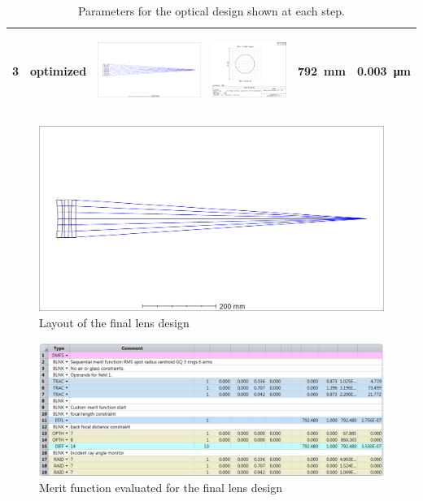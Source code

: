 \documentclass[10pt]{article}
\begin{document}
\begin{table}[h!]
\begin{tabular}{|r|l|c|c|r|r|}
		3 & optimized & \includegraphics[trim={0.25cm 10cm 40cm 10cm}, clip,height=2.5cm]{../zemax/3_threeElement/2_optimize_RMS/layout.png} & 
		\includegraphics[trim={7.1cm 8.5cm 12cm 2.6cm}, clip,height=2.5cm]{../zemax/3_threeElement/2_optimize_RMS/spot.png} & \SI{792}{\milli \meter} &  \SI{0.003}{\micro \meter}	\\\hline		
	\end{tabular}
	\caption{Parameters for the optical design shown at each step.}	
	\label{opt}
\end{table}

\begin{figure}[h!]
	\centering
	\includegraphics[width=0.75\linewidth]{../zemax/3_threeElement/2_optimize_RMS/layout}
	\caption{Layout of the final lens design}
\end{figure}

\begin{figure}[h!]
	\centering
	\includegraphics[width=0.75\linewidth]{../zemax/3_threeElement/2_optimize_RMS/merit}
	\caption{Merit function evaluated for the final lens design}
\end{figure}
\end{document}
